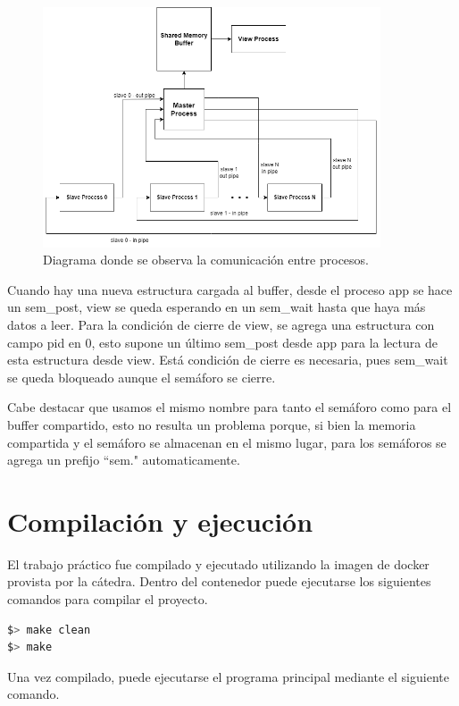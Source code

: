 \documentclass{article}
\begin{document}
\begin{figure}[H]
\begin{center}
\includegraphics[width=100mm]{diagramaComunicacion}
\caption{Diagrama donde se observa la comunicación entre procesos.}
\label{fig:diagramaComunicacion}
\end{center}
\end{figure}

Cuando hay una nueva estructura cargada al buffer, desde el proceso app se hace un sem\_post, view se queda esperando en un sem\_wait hasta que haya más datos a leer. Para la condición de cierre de view, se agrega una estructura con campo pid en 0, esto supone un último sem\_post desde app para la lectura de esta estructura desde view. Está condición de cierre es necesaria, pues sem\_wait se queda bloqueado aunque el semáforo se cierre.

Cabe destacar que usamos el mismo nombre para tanto el semáforo como para el buffer compartido, esto no resulta un problema porque, si bien la memoria compartida y el semáforo se almacenan en el mismo lugar, para los semáforos se agrega un prefijo ``sem." automaticamente.

\section{Compilación y ejecución}

El trabajo práctico fue compilado y ejecutado utilizando la imagen de docker provista por la cátedra. Dentro del contenedor puede ejecutarse los siguientes comandos para compilar el proyecto.

\begin{lstlisting}[language=bash]
$> make clean
$> make
\end{lstlisting}
Una vez compilado, puede ejecutarse el programa principal mediante el siguiente comando.
\end{document}
